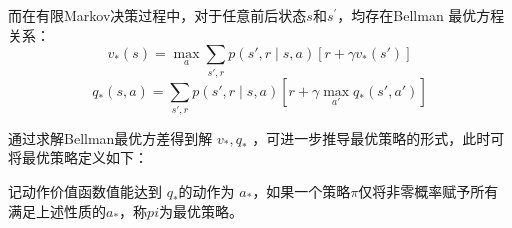 而在有限Markov决策过程中，对于任意前后状态$s$和$s^\prime$，均存在Bellman 最优方程关系\cite{white1963dynamic}：
\begin{equation}\label{eq:v_star}
    v_*(s)=\max_{a}\sum_{s',r}p(s',r \mid s,a)[r+\gamma v_*(s')]
\end{equation}
\begin{equation}\label{eq:q_star}
q_*(s,a) = \sum_{s',r}p(s',r \mid s,a)\left[r+\gamma \max_{a'}q_*(s',a') \right]
\end{equation}

通过求解Bellman最优方差得到解 $v_*,q_*$ ，可进一步推导最优策略的形式，此时可将最优策略定义如下：
\begin{definition}
    记动作价值函数值能达到 $q_*$的动作为 $a_*$，如果一个策略$\pi$仅将非零概率赋予所有满足上述性质的$a_*$，称$pi$为最优策略。
\end{definition}







